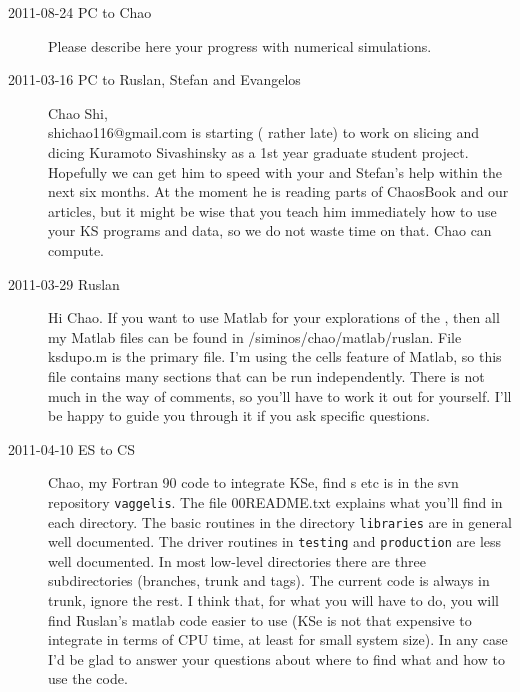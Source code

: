 \begin{description}

\item[2011-08-24 PC to Chao]
Please describe here your progress with numerical simulations.

\item[2011-03-16 PC to Ruslan, Stefan and Evangelos]
   Chao Shi,
\\ shichao116@gmail.com is starting ( rather late) to work on
   slicing and dicing Kuramoto Sivashinsky as a 1st year graduate student
   project. Hopefully we can get him to speed with your and Stefan's help
   within the next six months. At the moment he is reading parts of
   ChaosBook and our articles, but it might be wise that you teach him
   immediately how to use your KS programs and data, so we do not waste
   time on that. Chao can compute.

\item[2011-03-29 Ruslan]
Hi Chao.  If you want to use Matlab for your explorations of the \KS,
then all my Matlab files can be found in /siminos/chao/matlab/ruslan.
File ksdupo.m is the primary file.  I'm using the cells feature of
Matlab, so this file contains many sections that can be run
independently.  There is not much in the way of comments, so you'll have
to work it out for yourself.  I'll be happy to guide you through it if
you ask specific questions.

\item[2011-04-10 ES to CS] Chao, my Fortran 90 code to integrate KSe, find
\po s etc is in the svn repository \texttt{vaggelis}. The file 00README.txt
explains what you'll find in each directory. The basic routines in the
directory \texttt{libraries} are in general well documented. The driver routines in
\texttt{testing} and \texttt{production} are less well documented. In most
low-level directories there are three subdirectories (branches, trunk and tags).
The current code is always in trunk, ignore the rest. I think that, for what you
will have to do, you will find Ruslan's matlab code easier to use (KSe is not that
expensive to integrate in terms of CPU time, at least for small system size). In any
case I'd be glad to answer your questions about where to find what and how to
use the code.


\end{description}
